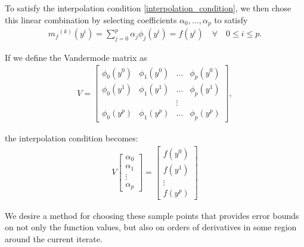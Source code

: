 \documentclass{article}
\theoremstyle{case}
\newcommand{\mfk}{{{m}_f}^{(k)}}
\begin{document}
To satisfy the interpolation condition \cref{interpolation_condition}, we then chose this linear combination by selecting coefficients $\alpha_0, \ldots, \alpha_p$ to satisfy
\begin{align}
\label{interpolation_formula}
    \mfk(y^i) = \sum^p_{j=0}\alpha_j\phi_j(y^i) = f(y^i) \quad \forall \quad 0 \le i \le p.
\end{align}

If we define the Vandermode matrix as
\begin{align}
\label{vandermonde}
V=
\begin{bmatrix}
    \phi_0(y^0)      & \phi_1(y^0)       & \ldots & \phi_{p}(y^0)      \\
    \phi_0(y^1)      & \phi_1(y^1)       & \dots  & \phi_{p}(y^1)      \\
                     &                   & \vdots &                    \\
    \phi_0(y^{p})    & \phi_1(y^{p})     & \ldots & \phi_{p}(y^{p})
\end{bmatrix},
\end{align}

the interpolation condition becomes:
\begin{align}
\label{matrix_form}
V
\begin{bmatrix}
    \alpha_0     \\
    \alpha_1     \\
    \vdots       \\
    \alpha_p
\end{bmatrix}
=
\begin{bmatrix}
    f(y^0)     \\
    f(y^1)     \\
    \vdots     \\
    f(y^p)
\end{bmatrix}
\end{align}

We desire a method for choosing these sample points that provides error bounds on not only the function values, but also on orders of derivatives in some region around the current iterate.

\end{document}
